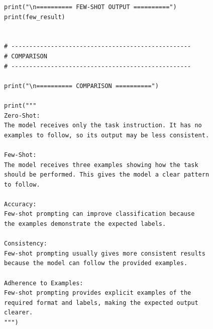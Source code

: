 \documentclass[10pt,a4paper]{article}
\begin{document}
\begin{lstlisting}[style=code]
print("\n========== FEW-SHOT OUTPUT ==========")
print(few_result)


# --------------------------------------------------
# COMPARISON
# --------------------------------------------------

print("\n========== COMPARISON ==========")

print("""
Zero-Shot:
The model receives only the task instruction. It has no
examples to follow, so its output may be less consistent.

Few-Shot:
The model receives three examples showing how the task
should be performed. This gives the model a clear pattern
to follow.

Accuracy:
Few-shot prompting can improve classification because
the examples demonstrate the expected labels.

Consistency:
Few-shot prompting usually gives more consistent results
because the model can follow the provided examples.

Adherence to Examples:
Few-shot prompting provides explicit examples of the
required format and labels, making the expected output
clearer.
""")
\end{lstlisting}
\end{document}
